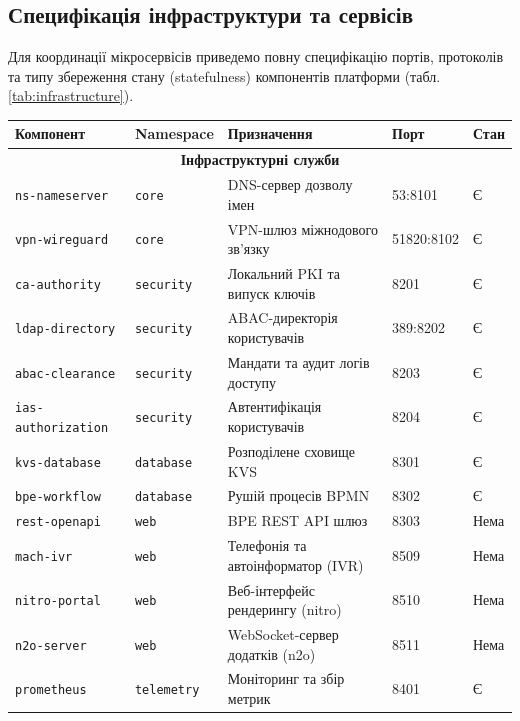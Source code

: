 \documentclass{article}
\begin{document}
\subsection{Специфікація інфраструктури та сервісів}
Для координації мікросервісів приведемо повну специфікацію портів, протоколів та типу збереження стану (statefulness) компонентів платформи (табл. \ref{tab:infrastructure}).

\begin{table}[h!]
\small
\begin{tabular}{|l|l|p{5cm}|l|l|}
\hline
\textbf{Компонент} & \textbf{Namespace} & \textbf{Призначення} & \textbf{Порт} & \textbf{Стан} \\ \hline
\multicolumn{5}{|c|}{\textbf{Інфраструктурні служби}} \\ \hline
\texttt{ns-nameserver}     & \texttt{core}      & DNS-сервер дозволу імен           & 53:8101 & Є \\ \hline
\texttt{vpn-wireguard}     & \texttt{core}      & VPN-шлюз міжнодового зв'язку      & 51820:8102 & Є \\ \hline
\texttt{ca-authority}      & \texttt{security}  & Локальний PKI та випуск ключів    & 8201 & Є \\ \hline
\texttt{ldap-directory}    & \texttt{security}  & ABAC-директорія користувачів      & 389:8202 & Є \\ \hline
\texttt{abac-clearance}    & \texttt{security}  & Мандати та аудит логів доступу    & 8203 & Є \\ \hline
\texttt{ias-authorization} & \texttt{security}  & Автентифікація користувачів       & 8204 & Є \\ \hline
\texttt{kvs-database}      & \texttt{database}  & Розподілене сховище KVS           & 8301 & Є \\ \hline
\texttt{bpe-workflow}      & \texttt{database}  & Рушій процесів BPMN               & 8302 & Є \\ \hline
\texttt{rest-openapi}      & \texttt{web}       & BPE REST API шлюз                 & 8303 & Нема \\ \hline
\texttt{mach-ivr}          & \texttt{web}       & Телефонія та автоінформатор (IVR) & 8509 & Нема \\ \hline
\texttt{nitro-portal}      & \texttt{web}       & Веб-інтерфейс рендерингу (nitro)  & 8510 & Нема \\ \hline
\texttt{n2o-server}        & \texttt{web}       & WebSocket-сервер додатків (n2o)   & 8511 & Нема \\ \hline
\texttt{prometheus}        & \texttt{telemetry} & Моніторинг та збір метрик         & 8401 & Є \\ \hline

\end{tabular}
\end{table}
\end{document}
